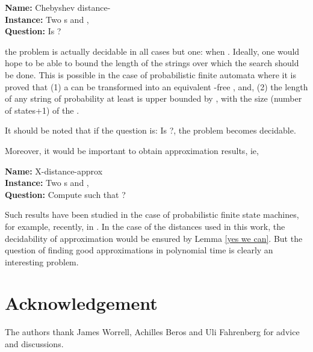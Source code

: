 \documentclass[submission]{eptcs} \usepackage{breakurl}             \usepackage[english]{babel}
\begin{document}
\vspace{0.1in}
\noindent\textbf{Name:} Chebyshev distance-  \\
\textbf{Instance:} Two s  and , \\
\textbf{Question:} Is ?

\vspace{0.1in}
the problem is actually decidable in all cases but one: when .
Ideally, one would hope to be able to bound the length of the strings over which the search should be done. This is possible in the case of probabilistic finite automata where it is proved that (1) a  can be transformed into an equivalent -free  , and, (2) the length of any string of probability at least  is upper bounded by , with  the size (number of states+1) of the  \cite{higu13b}.

It should be noted that if the question is: Is ?, the problem becomes decidable.

Moreover, it would be important to obtain approximation results, ie,

\vspace{0.1in}
\noindent\textbf{Name:} X-distance-approx  \\
\textbf{Instance:} Two s  and , \\
\textbf{Question:} Compute  such that ?

\vspace{0.1in}

Such results have been studied in the case of probabilistic finite state machines, for example, recently, in \cite{chen14}. In the case of the distances used in this work, the decidability of approximation would be ensured by  Lemma \ref{yes we can}. But the question of finding good approximations in polynomial time is clearly an interesting problem.
\section*{Acknowledgement}
The authors thank James Worrell, Achilles Beros and Uli Fahrenberg for advice and discussions.


\end{document}
